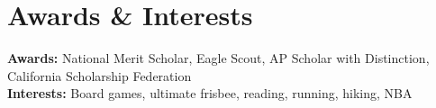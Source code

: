 \documentclass[letterpaper,11pt]{article}
\begin{document}
\section{Awards \& Interests}
  \begin{itemize}[leftmargin=0.15in, label={}]
    \small{\item{
      \textbf{Awards:} National Merit Scholar, Eagle Scout, AP Scholar with Distinction, California Scholarship Federation \\
      \textbf{Interests:} Board games, ultimate frisbee, reading, running, hiking, NBA
    }}
  \end{itemize}
\end{document}
